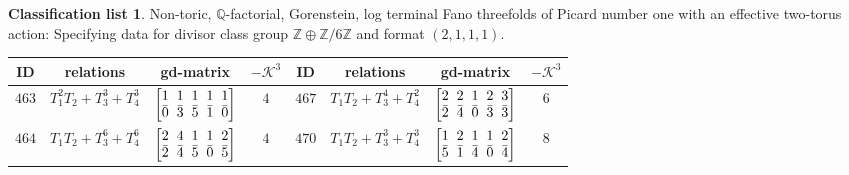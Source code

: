 \documentclass[10pt,a4paper]{amsart}
\theoremstyle{definition}
\newtheorem{class-list}[thm]{Classification list}
\def\ZZ{{\mathbb Z}}
\def\QQ{{\mathbb Q}}
\numberwithin{equation}{section}
\begin{document}
\begin{class-list}
Non-toric, $\QQ$-factorial, Gorenstein, log terminal Fano
threefolds of Picard number one with an effective two-torus action:
Specifying data for divisor class group $\ZZ\oplus \ZZ/6\ZZ$ and
format $(2,1,1,1)$.
\begin{table}[h!]\centering\setlength{\tabcolsep}{3.5pt}
\renewcommand{\arraystretch}{1.1}\small\tabulinesep=1mm
\begin{tabu}{c|c|c|c||c|c|c|c}
\hline
ID&relations&gd-matrix&$-\mathcal{K}^3$&ID&relations&gd-matrix&$-\mathcal{K}^3$
\\
\hline
${463}$&${T_{1}^{2}T_{2}+T_{3}^{3}+T_{4}^{3}}$
&$\arraycolsep=1mm\begin{bmatrix}{1} & {1} & {1} & {1} & {1} \\ {\bar{0}} & {\bar{3}} & {\bar{5}} & {\bar{1}} & {\bar{0}}\end{bmatrix}$&${4}$
&${467}$&${T_{1}T_{2}+T_{3}^{4}+T_{4}^{2}}$
&$\arraycolsep=1mm\begin{bmatrix}{2} & {2} & {1} & {2} & {3} \\ {\bar{2}} & {\bar{4}} & {\bar{0}} & {\bar{3}} & {\bar{3}}\end{bmatrix}$&${6}$
\\
\hline
${464}$&${T_{1}T_{2}+T_{3}^{6}+T_{4}^{6}}$
&$\arraycolsep=1mm\begin{bmatrix}{2} & {4} & {1} & {1} & {2} \\ {\bar{2}} & {\bar{4}} & {\bar{5}} & {\bar{0}} & {\bar{5}}\end{bmatrix}$&${4}$
&${470}$&${T_{1}T_{2}+T_{3}^{3}+T_{4}^{3}}$
&$\arraycolsep=1mm\begin{bmatrix}{1} & {2} & {1} & {1} & {2} \\ {\bar{5}} & {\bar{1}} & {\bar{4}} & {\bar{0}} & {\bar{4}}\end{bmatrix}$&${8}$
\\
\hline
\end{tabu}\vspace{-2mm}
\end{table}
\end{class-list}
\end{document}
